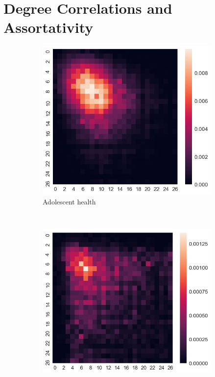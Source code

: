 \section{Degree Correlations and Assortativity}

\begin{figure}[h]
    \centering
    \begin{subfigure}[b]{0.3\textwidth}
        \includegraphics[width=\textwidth]{img/heatmap_0}
        \caption*{Adolescent health}
    \end{subfigure}
    ~
    \begin{subfigure}[b]{0.3\textwidth}
        \includegraphics[width=\textwidth]{img/heatmap_1}

\end{subfigure}
\end{figure}
